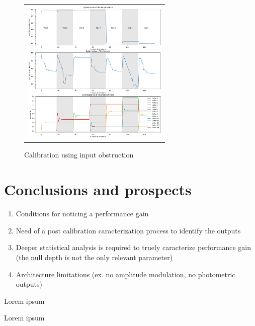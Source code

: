 \documentclass{aa}
\begin{document}
    \begin{figure}[H]
        \begin{center}
        \begin{tabular}{c}
        \includegraphics[height=7cm]{img/calibration_obstruction.png}
        \end{tabular}
        \end{center}
        \caption[calibration_obstruction] 
        { \label{fig:calibration_obstruction} 
        Calibration using input obstruction}
    \end{figure}


\section{Conclusions and prospects}

   \begin{enumerate}
      \item Conditions for noticing a performance gain
      \item Need of a post calibration caracterization process to identify the outputs
      \item Deeper statistical analysis is required to truely caracterize performance gain (the null depth is not the only relevant parameter)
      \item Architecture limitations (ex. no amplitude modulation, no photometric outputs)
   \end{enumerate}

\begin{acknowledgements}
      Lorem ipsum
\end{acknowledgements}

%
%

\begin{thebibliography}{}

   Lorem ipsum

\end{thebibliography}
\end{document}
